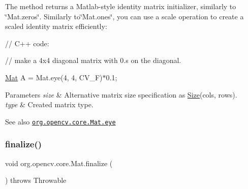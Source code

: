 The method returns a Matlab-\/style identity matrix initializer, similarly to \char`\"{}\+Mat.\+zeros\char`\"{}. Similarly to\char`\"{}\+Mat.\+ones\char`\"{}, you can use a scale operation to create a scaled identity matrix efficiently\+: {\ttfamily }

{\ttfamily }

{\ttfamily }

{\ttfamily // C++ code\+:}

{\ttfamily }

{\ttfamily }

{\ttfamily // make a 4x4 diagonal matrix with 0.\textquotesingle{}s on the diagonal.}

{\ttfamily }

{\ttfamily }

{\ttfamily \mbox{\hyperlink{classorg_1_1opencv_1_1core_1_1_mat}{Mat}} A = Mat.\+eye(4, 4, C\+V\+\_\+F)$\ast$0.1;}

{\ttfamily }

{\ttfamily 
\begin{DoxyParams}{Parameters}
{\em size} & Alternative matrix size specification as {\ttfamily \mbox{\hyperlink{classorg_1_1opencv_1_1core_1_1_size}{Size}}(cols, rows)}. \\
\hline
{\em type} & Created matrix type.\\
\hline
\end{DoxyParams}
\begin{DoxySeeAlso}{See also}
\href{http://docs.opencv.org/modules/core/doc/basic_structures.html#mat-eye}{\tt org.\+opencv.\+core.\+Mat.\+eye} 
\end{DoxySeeAlso}
}\mbox{\label{classorg_1_1opencv_1_1core_1_1_mat_aca52fe6f5554bfbff11c44e07952ba2d}} 
\subsubsection{\texorpdfstring{finalize()}{finalize()}}
{\footnotesize\ttfamily void org.\+opencv.\+core.\+Mat.\+finalize (\begin{DoxyParamCaption}{ }\end{DoxyParamCaption}) throws Throwable\hspace{0.3cm}{\ttfamily [protected]}}

\mbox{\label{classorg_1_1opencv_1_1core_1_1_mat_a5770a138198285c9cc0a9545bda1b0ac}} 

